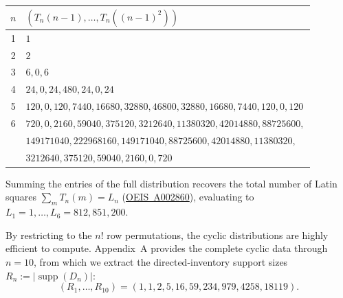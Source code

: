 \documentclass[11pt,a4paper]{amsart}
\newcommand{\1}{\mathbf{1}}
\begin{document}
\begin{center}
\small
\begin{longtable}{c|l}
\toprule
$n$ & $(T_n(n-1),\ldots,T_n((n-1)^2))$\\
\midrule
1 & $1$\\
2 & $2$\\
3 & $6,0,6$\\
4 & $24,0,24,480,24,0,24$\\
5 & $120,0,120,7440,16680,32880,46800,32880,16680,7440,120,0,120$\\
6 & $720,0,2160,59040,375120,3212640,11380320,42014880,88725600,$\\
  & $149171040,222968160,149171040,88725600,42014880,11380320,$\\
  & $3212640,375120,59040,2160,0,720$\\
\bottomrule
\end{longtable}
\end{center}
Summing the entries of the full distribution recovers the total number of Latin squares $\sum_m T_n(m) = L_n$ (\href{https://oeis.org/A002860}{OEIS~A002860}), evaluating to $L_1=1, \dots, L_6=812{,}851{,}200$.

By restricting to the $n!$ row permutations, the cyclic distributions are highly efficient to compute. Appendix~A provides the complete cyclic data through $n=10$, from which we extract the directed-inventory support sizes $R_n := |\operatorname{supp}(D_n)|$:
\begin{equation*}
    (R_1, \dots, R_{10}) = (1, 1, 2, 5, 16, 59, 234, 979, 4258, 18119).
\end{equation*}
\end{document}
